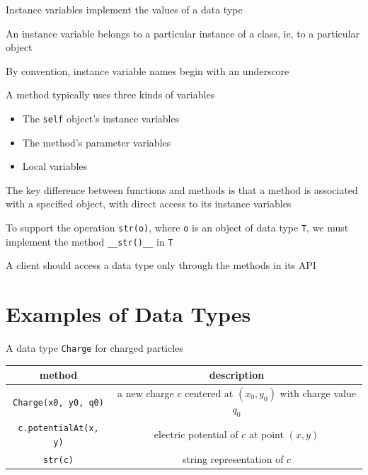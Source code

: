 \documentclass[8pt,a4paper,compress]{beamer}
\begin{document}
\begin{frame}[fragile]
\pause

Instance variables implement the values of a data type 

\pause
\bigskip

An instance variable belongs to a particular instance of a class, ie, to a particular object 

\pause
\bigskip

By convention, instance variable names begin with an underscore

\pause
\bigskip

A method typically uses three kinds of variables
\begin{itemize}
\item The \lstinline{self} object's instance variables

\item The method's parameter variables

\item Local variables
\end{itemize}

\pause
\bigskip

The key difference between functions and methods is that a method is associated with a specified object, with direct access to its instance variables

\pause
\bigskip

To support the operation \lstinline{str(o)}, where \lstinline{o} is an object of data type \lstinline{T}, we must implement the method \lstinline{__str()__} in \lstinline{T}

\pause
\bigskip

A client should access a data type only through the methods in its API
\end{frame}

\section{Examples of Data Types}

\begin{frame}[fragile]
\pause

A data type \lstinline{Charge} for charged particles
\begin{center}
\begin{tabular}{cc}
method & description \\ \hline
\lstinline$Charge(x0, y0, q0)$ & a new charge $c$ centered at $(x_0, y_0)$ with charge value $q_0$ \\
\lstinline$c.potentialAt(x, y)$ & electric potential of $c$ at point $(x, y)$ \\
\lstinline$str(c)$ & string representation of $c$
\end{tabular} 
\end{center}
\end{frame}
\end{document}

